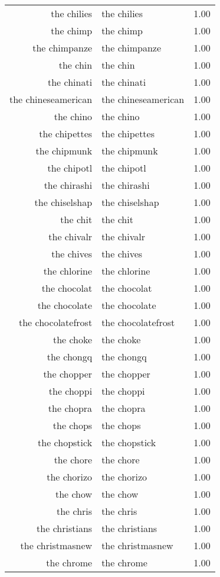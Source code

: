 \begin{table}[ht]
\begin{tabular}{rlr}
  the chilies & the chilies & 1.00 \\ 
  the chimp & the chimp & 1.00 \\ 
  the chimpanze & the chimpanze & 1.00 \\ 
  the chin & the chin & 1.00 \\ 
  the chinati & the chinati & 1.00 \\ 
  the chineseamerican & the chineseamerican & 1.00 \\ 
  the chino & the chino & 1.00 \\ 
  the chipettes & the chipettes & 1.00 \\ 
  the chipmunk & the chipmunk & 1.00 \\ 
  the chipotl & the chipotl & 1.00 \\ 
  the chirashi & the chirashi & 1.00 \\ 
  the chiselshap & the chiselshap & 1.00 \\ 
  the chit & the chit & 1.00 \\ 
  the chivalr & the chivalr & 1.00 \\ 
  the chives & the chives & 1.00 \\ 
  the chlorine & the chlorine & 1.00 \\ 
  the chocolat & the chocolat & 1.00 \\ 
  the chocolate & the chocolate & 1.00 \\ 
  the chocolatefrost & the chocolatefrost & 1.00 \\ 
  the choke & the choke & 1.00 \\ 
  the chongq & the chongq & 1.00 \\ 
  the chopper & the chopper & 1.00 \\ 
  the choppi & the choppi & 1.00 \\ 
  the chopra & the chopra & 1.00 \\ 
  the chops & the chops & 1.00 \\ 
  the chopstick & the chopstick & 1.00 \\ 
  the chore & the chore & 1.00 \\ 
  the chorizo & the chorizo & 1.00 \\ 
  the chow & the chow & 1.00 \\ 
  the chris & the chris & 1.00 \\ 
  the christians & the christians & 1.00 \\ 
  the christmasnew & the christmasnew & 1.00 \\ 
  the chrome & the chrome & 1.00 \\ 

\end{tabular}
\end{table}
